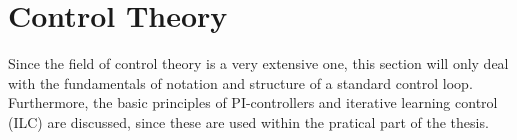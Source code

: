 
\chapter{Control Theory}
Since the field of control theory is a very extensive one, this section will only deal with the fundamentals of notation and structure of a standard control loop. Furthermore, the basic principles of PI-controllers and  iterative learning control (ILC) are discussed, since these are used within the pratical part of the thesis.
